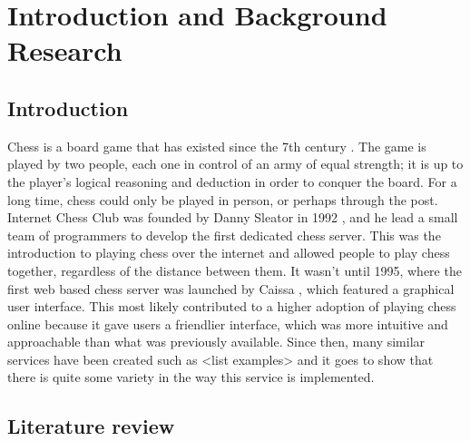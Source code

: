 \chapter{Introduction and Background Research}

\label{chapter1}

\section{Introduction}

Chess is a board game that has existed since the 7th century \cite{AHistoryOfChess}. The game is played by two people, each one in control of an army of equal strength; it is up to the player's logical reasoning and deduction in order to conquer the board. For a long time, chess could only be played in person, or perhaps through the post. Internet Chess Club was founded by Danny Sleator in 1992 \cite{InternetChessClub}, and he lead a small team of programmers to develop the first dedicated chess server. This was the introduction to playing chess over the internet and allowed people to play chess together, regardless of the distance between them. It wasn't until 1995, where the first web based chess server was launched by Caissa \cite{Caissa}, which featured a graphical user interface. This most likely contributed to a higher adoption of playing chess online because it gave users a friendlier interface, which was more intuitive and approachable than what was previously available. Since then, many similar services have been created such as <list examples> and it goes to show that there is quite some variety in the way this service is implemented.


\section{Literature review}
